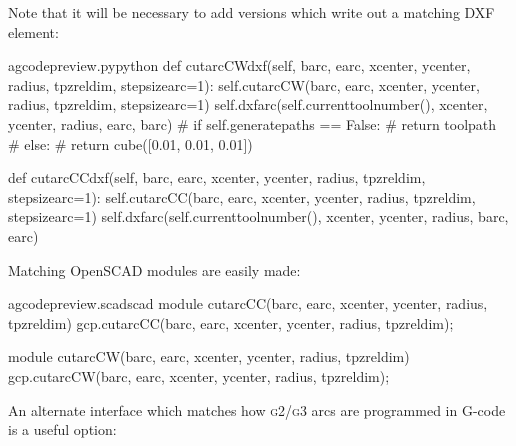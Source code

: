 \documentclass{ltxdoc}
\begin{document}
Note that it will be necessary to add versions which write out a matching DXF element:


\lstset{firstnumber=\thegcpy}
\begin{writecode}{a}{gcodepreview.py}{python}
    def cutarcCWdxf(self, barc, earc, xcenter, ycenter, radius, tpzreldim, stepsizearc=1):
        self.cutarcCW(barc, earc, xcenter, ycenter, radius, tpzreldim, stepsizearc=1)
        self.dxfarc(self.currenttoolnumber(), xcenter, ycenter, radius, earc, barc)
#        if self.generatepaths == False:
#        return toolpath
#        else:
#            return cube([0.01, 0.01, 0.01])

    def cutarcCCdxf(self, barc, earc, xcenter, ycenter, radius, tpzreldim, stepsizearc=1):
        self.cutarcCC(barc, earc, xcenter, ycenter, radius, tpzreldim, stepsizearc=1)
        self.dxfarc(self.currenttoolnumber(), xcenter, ycenter, radius, barc, earc)

\end{writecode}
\addtocounter{gcpy}{12}

Matching OpenSCAD modules are easily made:

\lstset{firstnumber=\thegcpscad}
\begin{writecode}{a}{gcodepreview.scad}{scad}
module cutarcCC(barc, earc, xcenter, ycenter, radius, tpzreldim){
    gcp.cutarcCC(barc, earc, xcenter, ycenter, radius, tpzreldim);
}

module cutarcCW(barc, earc, xcenter, ycenter, radius, tpzreldim){
    gcp.cutarcCW(barc, earc, xcenter, ycenter, radius, tpzreldim);
}

\end{writecode}
\addtocounter{gcpscad}{8}

An alternate interface which matches how \textsc{g2/g3} arcs are programmed in G-code is a useful option:
\end{document}
